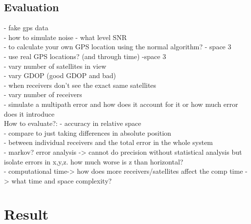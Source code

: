 \documentclass[11pt,a4paper]{article}
\begin{document}
\subsection{Evaluation} %
- fake gps data\\
- how to simulate noise - what level SNR\\
- to calculate your own GPS location using the normal algorithm? - space 3 \\
- use real GPS locations? (and through time) -space 3\\
- vary number of satellites in view\\
- vary GDOP (good GDOP and bad)\\
- when receivers don't see the exact same satellites \\
- vary number of receivers \\
- simulate a multipath error and how does it account for it or how much error does it introduce\\

How to evaluate?:
- accuracy in relative space\\
- compare to just taking differences in absolute position \\
- between individual receivers and the total error in the whole system\\
- markov? error analysis -> cannot do precision without statistical analysis but isolate errors in x,y,z. how much worse is z than horizontal?\\
- computational time-> how does more receivers/satellites affect the comp time -> what time and space complexity?


\section{Result}


\newpage


\end{document}
